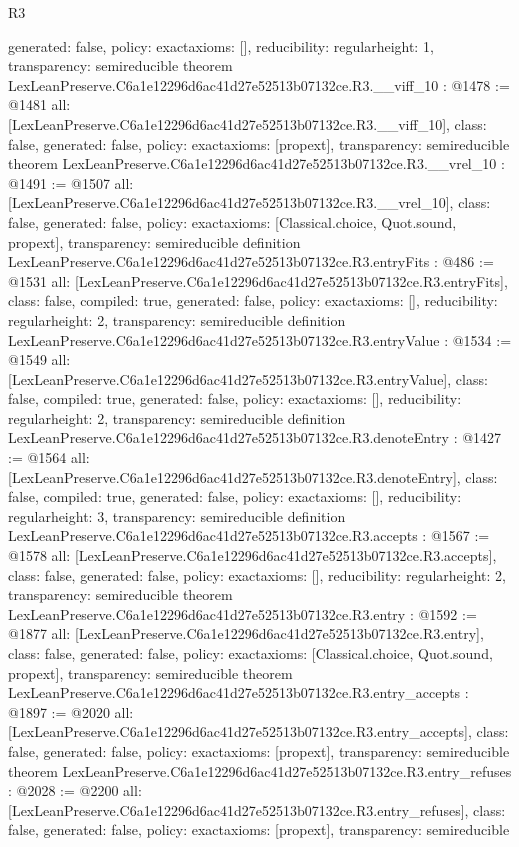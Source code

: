 \begin{lexlean}{R3}
\begin{coremodule}
{  generated: false,
  policy: exact{axioms: []},
  reducibility: regular{height: 1},
  transparency: semireducible
}
theorem LexLeanPreserve.C6a1e12296d6ac41d27e52513b07132ce.R3.__viff_10 : @1478 := @1481 {
  all: [LexLeanPreserve.C6a1e12296d6ac41d27e52513b07132ce.R3.__viff_10],
  class: false,
  generated: false,
  policy: exact{axioms: [propext]},
  transparency: semireducible
}
theorem LexLeanPreserve.C6a1e12296d6ac41d27e52513b07132ce.R3.__vrel_10 : @1491 := @1507 {
  all: [LexLeanPreserve.C6a1e12296d6ac41d27e52513b07132ce.R3.__vrel_10],
  class: false,
  generated: false,
  policy: exact{axioms: [Classical.choice, Quot.sound, propext]},
  transparency: semireducible
}
definition LexLeanPreserve.C6a1e12296d6ac41d27e52513b07132ce.R3.entryFits : @486 := @1531 {
  all: [LexLeanPreserve.C6a1e12296d6ac41d27e52513b07132ce.R3.entryFits],
  class: false,
  compiled: true,
  generated: false,
  policy: exact{axioms: []},
  reducibility: regular{height: 2},
  transparency: semireducible
}
definition LexLeanPreserve.C6a1e12296d6ac41d27e52513b07132ce.R3.entryValue : @1534 := @1549 {
  all: [LexLeanPreserve.C6a1e12296d6ac41d27e52513b07132ce.R3.entryValue],
  class: false,
  compiled: true,
  generated: false,
  policy: exact{axioms: []},
  reducibility: regular{height: 2},
  transparency: semireducible
}
definition LexLeanPreserve.C6a1e12296d6ac41d27e52513b07132ce.R3.denoteEntry : @1427 := @1564 {
  all: [LexLeanPreserve.C6a1e12296d6ac41d27e52513b07132ce.R3.denoteEntry],
  class: false,
  compiled: true,
  generated: false,
  policy: exact{axioms: []},
  reducibility: regular{height: 3},
  transparency: semireducible
}
definition LexLeanPreserve.C6a1e12296d6ac41d27e52513b07132ce.R3.accepts : @1567 := @1578 {
  all: [LexLeanPreserve.C6a1e12296d6ac41d27e52513b07132ce.R3.accepts],
  class: false,
  generated: false,
  policy: exact{axioms: []},
  reducibility: regular{height: 2},
  transparency: semireducible
}
theorem LexLeanPreserve.C6a1e12296d6ac41d27e52513b07132ce.R3.entry : @1592 := @1877 {
  all: [LexLeanPreserve.C6a1e12296d6ac41d27e52513b07132ce.R3.entry],
  class: false,
  generated: false,
  policy: exact{axioms: [Classical.choice, Quot.sound, propext]},
  transparency: semireducible
}
theorem LexLeanPreserve.C6a1e12296d6ac41d27e52513b07132ce.R3.entry_accepts : @1897 := @2020 {
  all: [LexLeanPreserve.C6a1e12296d6ac41d27e52513b07132ce.R3.entry_accepts],
  class: false,
  generated: false,
  policy: exact{axioms: [propext]},
  transparency: semireducible
}
theorem LexLeanPreserve.C6a1e12296d6ac41d27e52513b07132ce.R3.entry_refuses : @2028 := @2200 {
  all: [LexLeanPreserve.C6a1e12296d6ac41d27e52513b07132ce.R3.entry_refuses],
  class: false,
  generated: false,
  policy: exact{axioms: [propext]},
  transparency: semireducible
}


\end{coremodule}
\end{lexlean}
